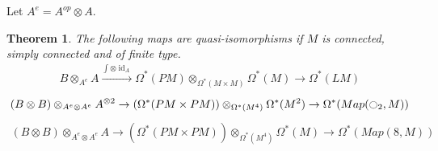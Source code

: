 \documentclass{scrartcl}
\theoremstyle{plain}
\newtheorem{theorem}{Theorem}[section]
\theoremstyle{definition}
\let\xto\xrightarrow
\DeclareMathOperator{\id}{id}
\DeclareMathOperator{\Map}{Map}
\begin{document}
Let $A^e=A^{op}\otimes A$. 

\begin{theorem}
    The following maps are quasi-isomorphisms if $M$ is connected, simply connected and of finite type.
    \begin{align*}
        B\otimes_{A^e} A\xto{\int\otimes\id_A}\Omega^*(PM)\otimes_{\Omega^*(M\times M)}\Omega^*(M)\to \Omega^*(LM)
    \end{align*}
    \begin{align*}
        (B\otimes B)\otimes_{A^e\otimes A^e} A^{\otimes 2} \to (\Omega^*(PM\times PM))\otimes_{\Omega^*(M^4)} \Omega^*(M^2) \to \Omega^*(Map(\ocircle_2, M))
    \end{align*}
    \begin{align*}
        (B\otimes B)\otimes_{A^e\otimes A^e} A \to (\Omega^*(PM\times PM))\otimes_{\Omega^*(M^4)} \Omega^*(M) \to \Omega^*(Map(8, M))
    \end{align*}

\end{theorem}
\end{document}
